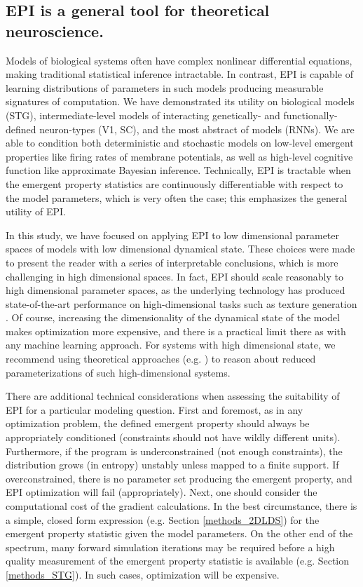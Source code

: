 \documentclass[11pt]{article}
\begin{document}
\subsection{EPI is a general tool for theoretical neuroscience.} 
Models of biological systems often have complex nonlinear differential equations, making traditional statistical inference intractable. 
In contrast, EPI is capable of learning distributions of parameters in such models producing measurable signatures of computation.
We have demonstrated its utility on biological models (STG), intermediate-level models of interacting genetically- and functionally-defined neuron-types (V1, SC), and the most abstract of models (RNNs).  
We are able to condition both deterministic and stochastic models on low-level emergent properties like firing rates of membrane potentials, as well as high-level cognitive function like approximate Bayesian inference.  
Technically, EPI is tractable when the emergent property statistics are continuously differentiable with respect to the model parameters, which is very often the case; this emphasizes the general utility of EPI.

In this study, we have focused on applying EPI to low dimensional parameter spaces of models with low dimensional dynamical state.
These choices were made to present the reader with a series of  interpretable conclusions, which is more challenging in high dimensional spaces.
In fact, EPI should scale reasonably to high dimensional parameter spaces, as the underlying technology has produced state-of-the-art performance on high-dimensional tasks such as texture generation \cite{loaiza2017maximum}.
Of course, increasing the dimensionality of the dynamical state of the model makes optimization more expensive, and there is a practical limit there as with any machine learning approach.
For systems with high dimensional state, we recommend using theoretical approaches (e.g. \cite{mastrogiuseppe2018linking}) to reason about reduced parameterizations of such high-dimensional systems.

There are additional technical considerations when assessing the suitability of EPI for a particular modeling question.  
First and foremost, as in any optimization problem, the defined emergent property should always be appropriately conditioned (constraints should not have wildly different units).  
Furthermore, if the program is underconstrained (not enough constraints), the distribution grows (in entropy) unstably unless mapped to a finite support.  
If overconstrained, there is no parameter set producing the emergent property, and EPI optimization will fail (appropriately).
Next, one should consider the computational cost of the gradient calculations. 
In the best circumstance, there is a simple, closed form expression (e.g. Section \ref{methods_2DLDS}) for the emergent property statistic given the model parameters.  
On the other end of the spectrum, many forward simulation iterations may be required before a high quality measurement of the emergent property statistic is available  (e.g. Section \ref{methods_STG}).  In such cases, optimization will be expensive.
\end{document}
